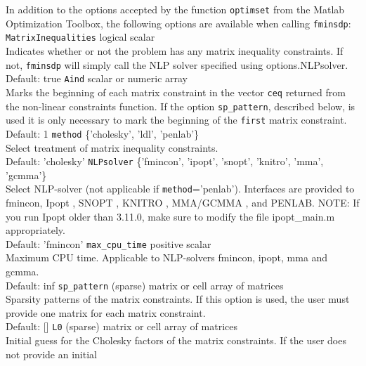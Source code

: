 \documentclass{article}
\begin{document}
In addition to the options accepted by the function \texttt{optimset} from the Matlab Optimization Toolbox, the
following options are available when calling \texttt{fminsdp}:
\vskip 2mm
\noindent \texttt{MatrixInequalities}  \hskip 1cm logical scalar\\
Indicates whether or not the problem has any matrix inequality constraints. If not, \texttt{fminsdp} will simply call the 
NLP solver specified using options.NLPsolver.\\
\noindent  Default: true 
\vskip 2mm
\noindent \texttt{Aind}  \hskip 3.5cm scalar or numeric array\\
Marks the beginning of each matrix constraint in the vector \texttt{ceq} returned from the non-linear constraints function. If
the option \texttt{sp\_pattern}, described below, is used it is only necessary to mark the beginning of the \texttt{first} matrix 
constraint.\\
\noindent  Default: 1
\vskip 2mm
\noindent \texttt{method} \hskip 3.0cm \{'cholesky', 'ldl', 'penlab'\} \\
Select treatment of matrix inequality constraints. \\
Default: 'cholesky'
\vskip 2mm
\noindent \texttt{NLPsolver} \hskip 2.5cm  \{'fmincon', 'ipopt', 'snopt', 'knitro', 'mma', 'gcmma'\}               \\
Select NLP-solver (not applicable if \texttt{method}='penlab'). Interfaces are provided to fmincon, Ipopt \cite{Wachter:2006}, SNOPT \cite{Gill:2002}, KNITRO \cite{Byrd:2006}, MMA/GCMMA \cite{Svanberg:2007}, and PENLAB.
NOTE: If you run Ipopt older than 3.11.0, make sure to modify the file ipopt\_main.m appropriately. \\
Default: 'fmincon'
\vskip 2mm
\noindent \texttt{max\_cpu\_time}  \hskip 2.1cm positive scalar \\
Maximum CPU time. Applicable to NLP-solvers fmincon, ipopt, mma and gcmma.\\
Default: inf       
\vskip 2mm
\noindent \texttt{sp\_pattern}  \hskip 2.3cm  (sparse) matrix or cell array of matrices\\
Sparsity patterns of the  matrix constraints. If this option is used, the user must provide one matrix for each matrix constraint. 
\\
\noindent  Default: []
\vskip 2mm
\noindent \texttt{L0} \hskip 3.2cm  (sparse) matrix  or cell array of matrices \\
Initial guess for the Cholesky factors of the matrix constraints. If the user does not provide an initial
\end{document}
